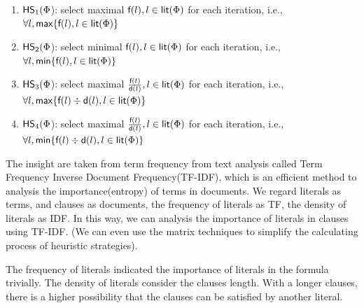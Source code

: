 \begin{enumerate}
    \item ${\sf HS}_1(\Phi$): select maximal $\textsf{f}(l), l\in\textsf{lit}(\Phi)$ for each iteration, i.e., $\forall l, {\sf max}\{\textsf{f}(l), l\in\textsf{lit}(\Phi)\}$
    \item ${\sf HS}_2(\Phi$): select minimal $\textsf{f}(l), l\in\textsf{lit}(\Phi)$ for each iteration, i.e., $\forall l, {\sf min}\{\textsf{f}(l), l\in\textsf{lit}(\Phi)\}$
   \item ${\sf HS}_3(\Phi$): select maximal  $\frac{\textsf{f}(l)}{\textsf{d}(l)}, l\in\textsf{lit}(\Phi)$ for each iteration, i.e., $\forall l, {\sf max}\{\textsf{f}(l)\div\textsf{d}(l), l\in\textsf{lit}(\Phi)\}$
    \item ${\sf HS}_4(\Phi$): select maximal $\frac{\textsf{f}(l)}{\textsf{d}(l)}, l\in\textsf{lit}(\Phi)$ for each iteration, i.e., $\forall l, {\sf min}\{\textsf{f}(l)\div\textsf{d}(l), l\in\textsf{lit}(\Phi)\}$
 \end{enumerate}

 The insight are taken from term frequency from text analysis called Term Frequency Inverse Document Frequency(TF-IDF), which is an efficient method to analysis the importance(entropy) of terms in documents.
 We regard literals as terms, and clauses as documents, the frequency of literals as TF, the density of literals as IDF. In this way, we can analysis the importance of literals in clauses using TF-IDF. (We can even use the matrix techniques to simplify the calculating process of heuristic strategies).

 The frequency of literals indicated the importance of literals in the formula trivially. The density of literals consider the clauses length. With a longer clauses, there is a higher possibility that the clauses can be satisfied by another literal.








